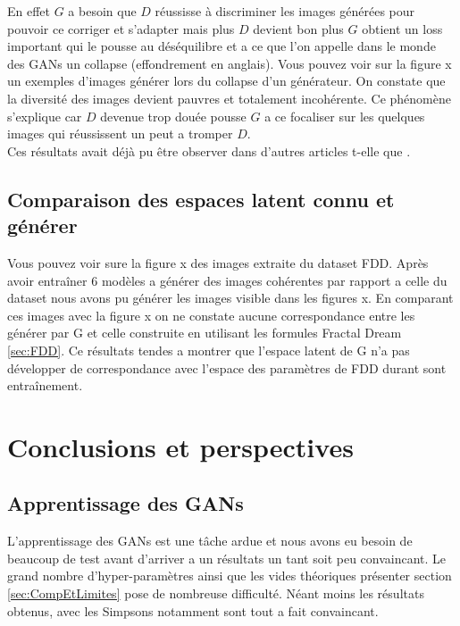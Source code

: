 \documentclass[11pt,francais]{article}
\begin{document}
En effet \(G\) a besoin que \(D\) réussisse à discriminer les images générées pour pouvoir ce corriger et s'adapter mais plus \(D\) devient bon plus \(G\) obtient un loss important qui le pousse au déséquilibre et a ce que l'on appelle dans le monde des GANs un collapse (effondrement en anglais). Vous pouvez voir sur la figure x un exemples d'images générer lors du collapse d'un générateur. On constate que la diversité des images devient pauvres et totalement incohérente. Ce phénomène s'explique car \(D\) devenue trop douée pousse \(G\) a ce focaliser sur les quelques images qui réussissent un peut a tromper \(D\).\\ 
Ces résultats avait déjà pu être observer dans d'autres articles t-elle que \cite{NIPS2014_5423}.

\subsection{Comparaison des espaces latent connu et générer}
\label{sec:ComparaisonLS}
Vous pouvez voir sure la figure x des images extraite du dataset FDD.
Après avoir entraîner 6 modèles a générer des images cohérentes par rapport a celle du dataset nous avons pu générer les images visible dans les figures x. 
En comparant ces images avec la figure x on ne constate aucune correspondance entre les générer par G et celle construite en utilisant les formules Fractal Dream \ref{sec:FDD}.
Ce résultats tendes a montrer que l'espace latent de G n'a pas développer de correspondance avec l'espace des paramètres de FDD durant sont entraînement. 


\section{Conclusions et perspectives}
\label{sec:Conclusion}

\subsection{Apprentissage des GANs}
L'apprentissage des GANs est une tâche ardue et nous avons eu besoin de beaucoup de test avant d'arriver a un résultats un tant soit peu convaincant. Le grand nombre d'hyper-paramètres ainsi que les vides théoriques présenter section \ref{sec:CompEtLimites} pose de nombreuse difficulté. Néant moins les résultats obtenus, avec les Simpsons notamment sont tout a fait convaincant.
\end{document}
